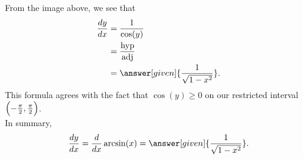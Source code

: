 \documentclass{ximera}
\begin{document}
\begin{theorem}
\begin{explanation}
%        
%        
%        
  From the image above, we see that 
  \begin{align*}
    \frac{dy}{dx} &= \frac{1}{\cos(y)}\\
    &=\frac{\mathrm{hyp}}{\mathrm{adj}}\\
    &= \answer[given]{\frac{1}{\sqrt{1-x^2}}}.
  \end{align*}
   This formula agrees with the fact that $\cos(y)\ge 0$ on our restricted interval $\Bigl(-\frac{\pi}{2},\frac{\pi}{2}\Bigr)$.\\
   
  In summary,
  \[
  \frac{dy}{dx} = \frac{d}{dx} \arcsin(x) = \answer[given]{\frac{1}{\sqrt{1-x^2}}}.
  \]
 
\end{explanation}
\end{theorem}
\end{document}
